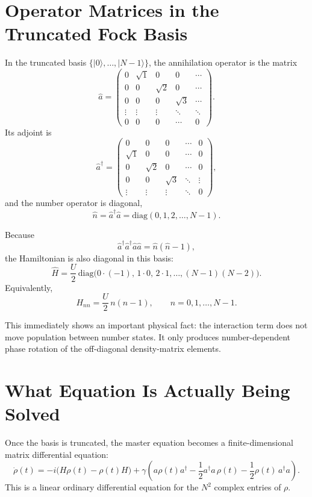 \documentclass[12pt]{article}
\begin{document}
\section*{Operator Matrices in the Truncated Fock Basis}
In the truncated basis $\{|0\rangle,\dots,|N-1\rangle\}$, the annihilation operator is the matrix
\[
\hat a =
\begin{pmatrix}
0 & \sqrt{1} & 0 & 0 & \cdots \\
0 & 0 & \sqrt{2} & 0 & \cdots \\
0 & 0 & 0 & \sqrt{3} & \cdots \\
\vdots & \vdots & \vdots & \ddots & \ddots \\
0 & 0 & 0 & \cdots & 0
\end{pmatrix}.
\]
Its adjoint is
\[
\hat a^\dagger =
\begin{pmatrix}
0 & 0 & 0 & \cdots & 0 \\
\sqrt{1} & 0 & 0 & \cdots & 0 \\
0 & \sqrt{2} & 0 & \cdots & 0 \\
0 & 0 & \sqrt{3} & \ddots & \vdots \\
\vdots & \vdots & \vdots & \ddots & 0
\end{pmatrix},
\]
and the number operator is diagonal,
\[
\hat n = \hat a^\dagger \hat a
= \mathrm{diag}(0,1,2,\dots,N-1).
\]

Because
\[
\hat a^\dagger \hat a^\dagger \hat a \hat a = \hat n(\hat n-1),
\]
the Hamiltonian is also diagonal in this basis:
\[
\hat H
= \frac{U}{2}\,\mathrm{diag}\!\bigl(0\cdot(-1),\,1\cdot 0,\,2\cdot 1,\dots,(N-1)(N-2)\bigr).
\]
Equivalently,
\[
H_{nn} = \frac{U}{2}\,n(n-1),
\qquad n=0,1,\dots,N-1.
\]

This immediately shows an important physical fact: the interaction term does not move population between number states. It only produces number-dependent phase rotation of the off-diagonal density-matrix elements.

\section*{What Equation Is Actually Being Solved}
Once the basis is truncated, the master equation becomes a finite-dimensional matrix differential equation:
\[
\dot{\rho}(t)
= -i\bigl(H\rho(t)-\rho(t)H\bigr)
+ \gamma\left(a\rho(t)a^\dagger - \frac{1}{2}a^\dagger a\,\rho(t) - \frac{1}{2}\rho(t)\,a^\dagger a\right).
\]
This is a linear ordinary differential equation for the $N^2$ complex entries of $\rho$.
\end{document}
